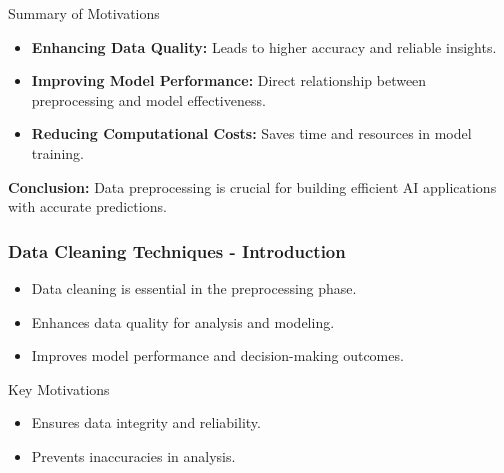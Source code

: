 \documentclass[aspectratio=169]{beamer}
\begin{document}
\begin{frame}[fragile]{Summary of Motivations}
    \begin{itemize}
        \item \textbf{Enhancing Data Quality:} Leads to higher accuracy and reliable insights.
        \item \textbf{Improving Model Performance:} Direct relationship between preprocessing and model effectiveness.
        \item \textbf{Reducing Computational Costs:} Saves time and resources in model training.
    \end{itemize}
    
    \textbf{Conclusion:} Data preprocessing is crucial for building efficient AI applications with accurate predictions.
\end{frame}

\begin{frame}[fragile]
    \frametitle{Data Cleaning Techniques - Introduction}
    \begin{itemize}
        \item Data cleaning is essential in the preprocessing phase.
        \item Enhances data quality for analysis and modeling.
        \item Improves model performance and decision-making outcomes.
    \end{itemize}
    \begin{block}{Key Motivations}
        \begin{itemize}
            \item Ensures data integrity and reliability.
            \item Prevents inaccuracies in analysis.
        \end{itemize}
    \end{block}
\end{frame}
\end{document}
